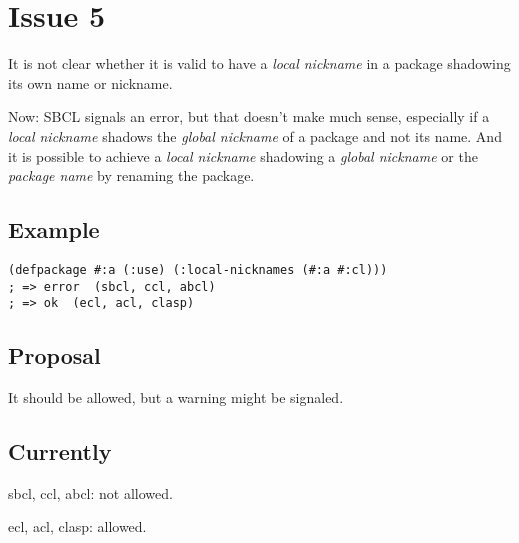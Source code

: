 \documentclass[11pt]{article}
\author{Grolter Bell}
\date{\today}
\title{}
\begin{document}
\section{Issue 5}
\label{sec:orgc3c13f4}
It is not clear whether it is valid to have a \emph{local nickname} in a package
shadowing its own name or nickname.

Now: SBCL signals an error, but that doesn't make much sense, especially if a
\emph{local nickname} shadows the \emph{global nickname} of a package and not its
name. And it is possible to achieve a \emph{local nickname} shadowing a \emph{global
nickname} or the \emph{package name} by renaming the package.
\subsection{Example}
\label{sec:orgc2b3c47}
\begin{verbatim}
(defpackage #:a (:use) (:local-nicknames (#:a #:cl)))
; => error  (sbcl, ccl, abcl)
; => ok  (ecl, acl, clasp)
\end{verbatim}
\subsection{Proposal}
\label{sec:org52498d4}
It should be allowed, but a warning might be signaled.
\subsection{Currently}
\label{sec:org0221858}
sbcl, ccl, abcl: not allowed.

ecl, acl, clasp: allowed.
\end{document}
